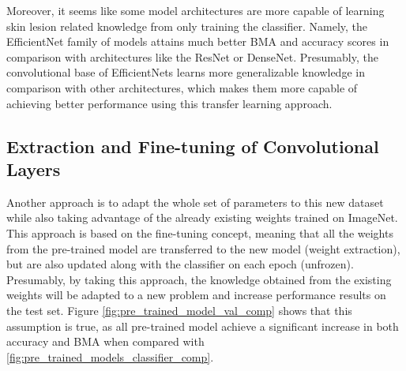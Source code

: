     Moreover, it seems like some model architectures are more capable of learning skin lesion related knowledge from only training the classifier. Namely, the EfficientNet family of models attains much better \ac{BMA} and accuracy scores in comparison with architectures like the ResNet or DenseNet. Presumably, the convolutional base of EfficientNets learns more generalizable knowledge in comparison with other architectures, which makes them more capable of achieving better performance using this transfer learning approach.  \par
    
    \subsection{Extraction and Fine-tuning of Convolutional Layers}
    Another approach is to adapt the whole set of parameters to this new dataset while also taking advantage of the already existing weights trained on ImageNet. This approach is based on the fine-tuning concept, meaning that all the weights from the pre-trained model are transferred to the new model (weight extraction), but are also updated along with the classifier on each epoch (unfrozen). Presumably, by taking this approach, the knowledge obtained from the existing weights will be adapted to a new problem and increase performance results on the test set. Figure \ref{fig:pre_trained_model_val_comp} shows that this assumption is true, as all pre-trained model achieve a significant increase in both accuracy and \ac{BMA} when compared with \autoref{fig:pre_trained_models_classifier_comp}. \par

